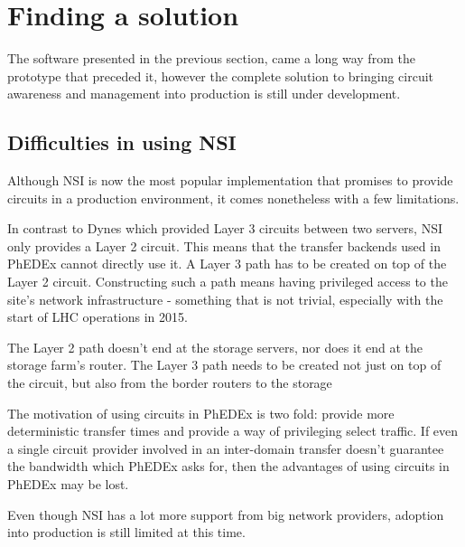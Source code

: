 \section{Finding a solution}

The software presented in the previous section, came a long way from the prototype 
that preceded it, however the complete solution to bringing circuit awareness and 
management into production is still under development.

\subsection{Difficulties in using NSI}

Although NSI is now the most popular implementation that promises to provide 
circuits in a production environment, it comes nonetheless with a few limitations.

\begin{description}[style=unboxed,leftmargin=0cm]
  \item[Provides a layer 2 circuit:] In contrast to Dynes which provided Layer 3 
  circuits between two servers, NSI only provides a Layer 2 circuit. This means that 
  the transfer backends used in PhEDEx cannot directly use it. A Layer 3 path 
  has to be created on top of the Layer 2 circuit. Constructing such a path means 
  having privileged access to the site's network infrastructure - something that is 
  not trivial, especially with the start of LHC operations in 2015.
  \item[Circuit ends at the border router:] The Layer 2 path doesn't end at the storage 
  servers, nor does it end at the storage farm's router. The Layer 3 path needs to 
  be created not just on top of the circuit, but also from the border routers to the 
  storage 
  \item[Guarantee bandwidth is not supported by all providers:] The motivation of using 
  circuits in PhEDEx is two fold: provide more deterministic transfer times and 
  provide a way of privileging select traffic. If even a single circuit provider 
  involved in an inter-domain transfer doesn't guarantee the bandwidth which PhEDEx 
  asks for, then the advantages of using circuits in PhEDEx may be lost.
  \item[NSI adoption is still limited:] Even though NSI has a lot more support from 
  big network providers, adoption into production is still limited at this time. 
\end{description}

